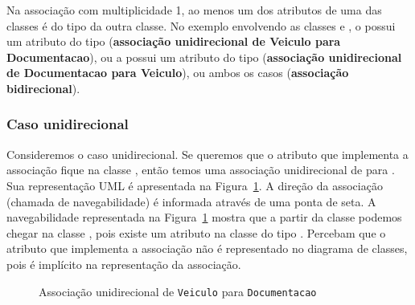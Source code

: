 Na associação com multiplicidade 1, ao menos um dos atributos de uma das classes é do tipo da outra classe. No exemplo envolvendo as classes  e , o  possui um atributo do tipo  (\textbf{associação unidirecional de Veiculo para Documentacao}), ou a  possui um atributo do tipo  (\textbf{associação unidirecional de Documentacao para Veiculo}), ou ambos os casos (\textbf{associação bidirecional}).

\subsubsection{Caso unidirecional}

Consideremos o caso unidirecional. Se queremos que o atributo que implementa a associação fique na classe , então temos uma associação unidirecional de  para . Sua representação UML é apresentada na Figura~\ref{fig:associacao-uni-veiculo}. A direção da associação (chamada de navegabilidade) é informada através de uma ponta de seta. A navegabilidade representada na Figura~\ref{fig:associacao-uni-veiculo} mostra que a partir da classe  podemos chegar na classe , pois existe um atributo na classe  do tipo . Percebam que o atributo que implementa a associação não é representado no diagrama de classes, pois é implícito na representação da associação.

\begin{figure}[h]
	\centering
	
	
	\caption{Associação unidirecional de \texttt{Veiculo} para \texttt{Documentacao}}
	\label{fig:associacao-uni-veiculo}
\end{figure}

